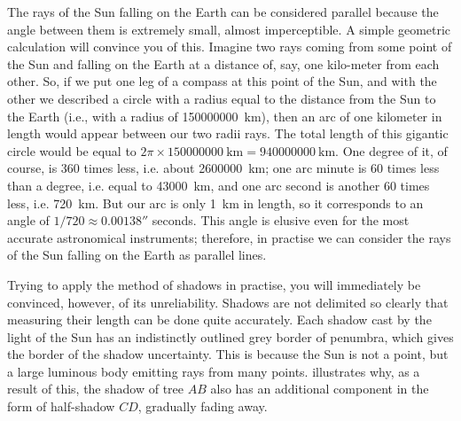 \ans The rays of the Sun falling on the Earth can be considered parallel because the angle between them is extremely small, almost imperceptible. A simple geometric calculation will convince you of this. Imagine two rays coming from some point of the Sun and falling on the Earth at a distance of, say, one kilo-meter from each other. So, if we put one leg of a compass at this point of the Sun, and with the other we described a circle with a radius equal to the distance from the Sun to the Earth (i.e., with a radius of \SI{150000000}{\kilo\meter}), then an arc of one kilometer in length would appear between our two radii rays. The total length of this gigantic circle would be equal to $2 \pi \times \SI{150000000}{\kilo\meter} = \SI{940000000}{\kilo\meter}$. One degree of it, of course, is 360 times less, i.e. about \SI{2600000}{\kilo\meter}; one arc minute is 60 times less than a degree, i.e. equal to \SI{43000}{\kilo\meter}, and one arc second is another 60 times less, i.e. \SI{720}{\kilo\meter}. But our arc is only \SI{1}{\kilo\meter} in length, so it corresponds to an angle of $1/720 \approx \ang{;;0.00138}$ seconds. This angle is elusive even for the most accurate astronomical instruments; therefore, in practise we can consider the rays of the Sun falling on the Earth as parallel lines.

Trying to apply the method of shadows in practise, you will immediately be convinced, however, of its unreliability. Shadows are not delimited so clearly that measuring their length can be done quite accurately. Each shadow cast by the light of the Sun has an indistinctly outlined grey border of penumbra, which gives the border of the shadow uncertainty. This is because the Sun is not a point, but a large luminous body emitting rays from many points.  illustrates why, as a result of this, the shadow of tree $AB$ also has an additional component in the form of half-shadow $CD$, gradually fading away.

